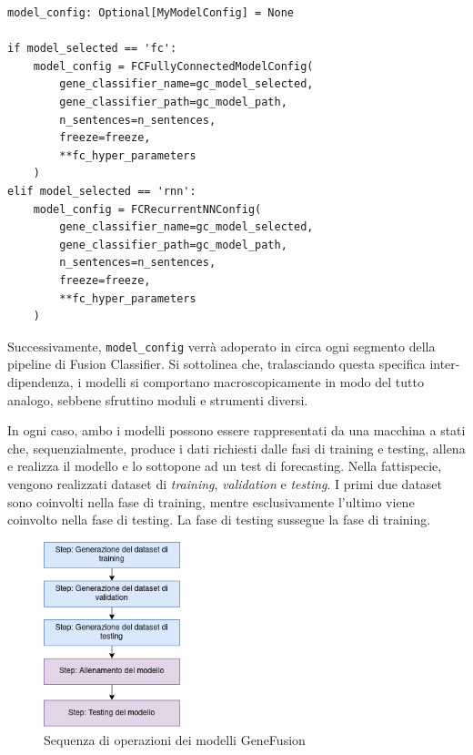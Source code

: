 \begin{code}
\label{code:apx:a:python}
\begin{verbatim}
model_config: Optional[MyModelConfig] = None

if model_selected == 'fc':
    model_config = FCFullyConnectedModelConfig(
        gene_classifier_name=gc_model_selected,
        gene_classifier_path=gc_model_path,
        n_sentences=n_sentences,
        freeze=freeze,
        **fc_hyper_parameters
    )
elif model_selected == 'rnn':
    model_config = FCRecurrentNNConfig(
        gene_classifier_name=gc_model_selected,
        gene_classifier_path=gc_model_path,
        n_sentences=n_sentences,
        freeze=freeze,
        **fc_hyper_parameters
    )
\end{verbatim}
\end{code}

Successivamente, {\small \verb|model_config|} verrà adoperato in circa ogni segmento della pipeline di Fusion Classifier. Si sottolinea che, tralasciando questa specifica inter-dipendenza, i modelli si comportano macroscopicamente in modo del tutto analogo, sebbene sfruttino moduli e strumenti diversi.

In ogni caso, ambo i modelli possono essere rappresentati da una macchina a stati che, sequenzialmente, produce i dati richiesti dalle fasi di training e testing, allena e realizza il modello e lo sottopone ad un test di forecasting. Nella fattispecie, vengono realizzati dataset di {\em training}, {\em validation} e {\em testing}. I primi due dataset sono coinvolti nella fase di training, mentre esclusivamente l'ultimo viene coinvolto nella fase di testing. La fase di testing sussegue la fase di training.

\begin{figure}[h]
    \centering
    \includegraphics[width=150px]{figures/ch2/gf_stati.png}
    \caption[Sequenza di operazioni dei modelli GeneFusion]{Sequenza di operazioni dei modelli GeneFusion}
    \label{fig:cha2:gf_stati}
\end{figure}

